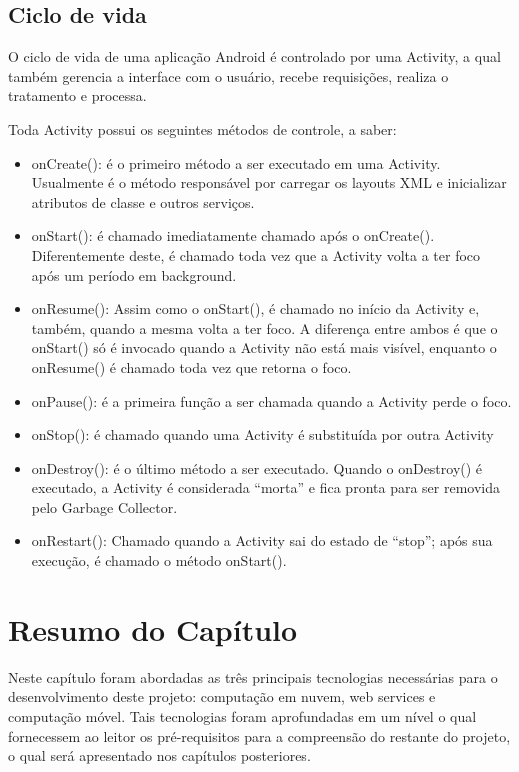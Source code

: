 \subsection{Ciclo de vida}
 	 O ciclo de vida de uma aplicação Android é controlado por uma Activity, a qual também gerencia a interface com o usuário, recebe requisições, realiza o tratamento e processa.
	 
 	Toda Activity possui os seguintes métodos de controle, a saber:
 \begin{itemize}
 \item onCreate(): é o primeiro método a ser executado em uma Activity. Usualmente é o método responsável por carregar os layouts XML e inicializar atributos de classe e outros serviços.
 \item onStart(): é chamado imediatamente chamado após o onCreate(). Diferentemente deste, é chamado toda vez que a Activity volta a ter foco após um período em background.
 \item onResume(): Assim como o onStart(), é chamado no início da Activity e, também, quando a mesma volta a ter foco. A diferença entre ambos é que o onStart() só é invocado quando a Activity não está mais visível, enquanto o onResume() é chamado toda vez que retorna o foco.
 \item onPause(): é a primeira função a ser chamada quando a Activity perde o foco.
 \item onStop(): é chamado quando uma Activity é substituída por outra Activity
 \item onDestroy(): é o último método a ser executado. Quando o onDestroy() é executado, a Activity é considerada ``morta'' e fica pronta para ser removida pelo Garbage Collector.
 \item	onRestart(): Chamado quando a Activity sai do estado de ``stop''; após sua execução, é chamado o método onStart().
 \end{itemize}

 \section{Resumo do Capítulo}

 	Neste capítulo foram abordadas as três principais tecnologias necessárias para o desenvolvimento deste projeto: computação em nuvem, web services e computação móvel. Tais tecnologias foram aprofundadas em um nível o qual fornecessem ao leitor os pré-requisitos para a compreensão do restante do projeto, o qual será apresentado nos capítulos posteriores.
 
